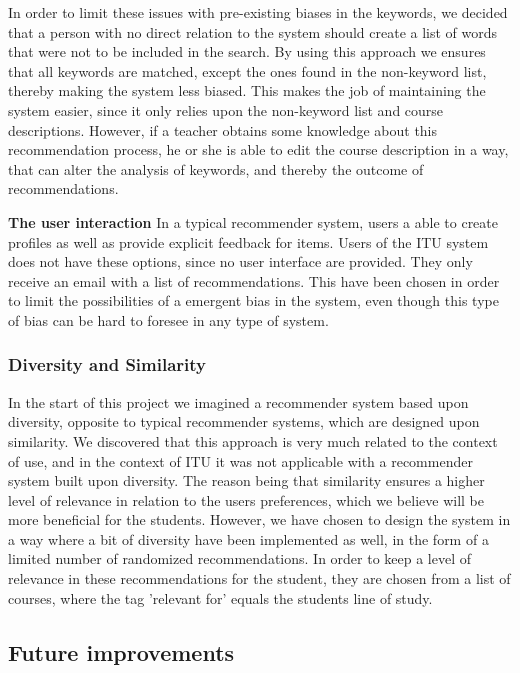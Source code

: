 In order to limit these issues with pre-existing biases in the keywords, we decided that a person with no direct relation to the system should create a list of words that were not to be included in the search. By using this approach we ensures that all keywords are matched, except the ones found in the non-keyword list, thereby making the system less biased.
This makes the job of maintaining the system easier, since it only relies upon the non-keyword list and course descriptions.\newline
However, if a teacher obtains some knowledge about this recommendation process, he or she is able to edit the course description in a way, that can alter the analysis of keywords, and thereby the outcome of recommendations.\newline

\textbf{The user interaction}\newline
In a typical recommender system, users a able to create profiles as well as provide explicit feedback for items. Users of the ITU system does not have these options, since no user interface are provided. They only receive an email with a list of recommendations. This have been chosen in order to limit the possibilities of a emergent bias in the system, even though this type of bias can be hard to foresee in any type of system.


\subsubsection{Diversity and Similarity}
In the start of this project we imagined a recommender system based upon diversity, opposite to typical recommender systems, which are designed upon similarity.\newline
We discovered that this approach is very much related to the context of use, and in the context of ITU it was not applicable with a recommender system built upon diversity. The reason being that similarity ensures a higher level of relevance in relation to the users preferences, which we believe will be more beneficial for the students. However, we have chosen to design the system in a way where a bit of diversity have been implemented as well, in the form of a limited number of randomized recommendations. In order to keep a level of relevance in these recommendations for the student, they are chosen from a list of courses, where the tag 'relevant for' equals the students line of study.

\subsection{Future improvements}

